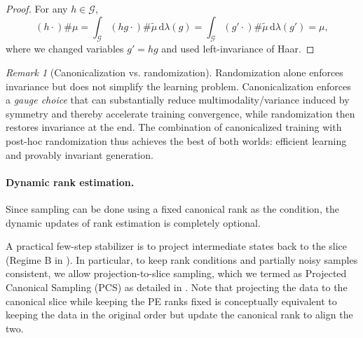 \documentclass{article}
\theoremstyle{plain}
\theoremstyle{definition}
\theoremstyle{remark}
\newtheorem{remark}[theorem]{Remark}
\newcommand{\1}{\mathbf{1}}
\newcommand{\Haar}{\lambda} %
\newcommand{\G}{\mathcal{G}}
\newcommand{\push}{\#} %
\newcommand{\acts}{\cdot} %
\begin{document}
\begin{proof}
For any $h\in\G$,
\begin{equation}
(h\acts)\push \mu = \int_{\G} (h g\acts)\push \tilde\mu\,\mathrm{d}\Haar(g)
= \int_{\G} (g'\acts)\push \tilde\mu\,\mathrm{d}\Haar(g')=\mu,
\end{equation}
where we changed variables $g'=hg$ and used left-invariance of Haar. \qedhere
\end{proof}

\begin{remark}[Canonicalization vs. randomization]
Randomization alone enforces invariance but does not simplify the learning problem. Canonicalization enforces a \emph{gauge choice} that can substantially reduce multimodality/variance induced by symmetry and thereby accelerate training convergence, while randomization then restores invariance at the end. 
The combination of canonicalized training with post-hoc randomization thus achieves the best of both worlds: efficient learning and provably invariant generation. 
\end{remark}

\paragraph{Dynamic rank estimation.} Since sampling can be done using a fixed canonical rank as the condition, the dynamic updates of rank estimation is completely optional. 

A practical few-step stabilizer is to project intermediate states back to the slice (Regime B in ). In particular, to keep rank conditions and partially noisy samples consistent, we allow projection-to-slice sampling, which we termed as Projected Canonical Sampling (PCS) as detailed in . Note that projecting the data to the canonical slice while keeping the PE ranks fixed is conceptually equivalent to keeping the data in the original order but update the canonical rank to align the two.
\end{document}
